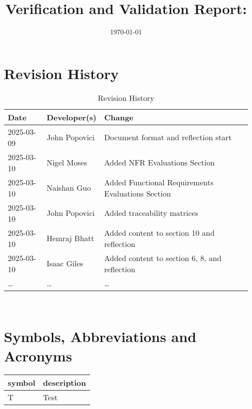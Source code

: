 \documentclass[12pt, titlepage]{article}
\begin{document}
\title{Verification and Validation Report: \progname} 
\author{\authname}
\date{\today}
	
\maketitle


\section{Revision History}

\begin{table}[hp]
\caption{Revision History} \label{TblRevisionHistory}
\begin{tabularx}{\textwidth}{llX}
\toprule
\textbf{Date} & \textbf{Developer(s)} & \textbf{Change}\\
\midrule
2025-03-09 & John Popovici & Document format and reflection start\\
2025-03-10 & Nigel Moses & Added NFR Evaluations Section\\
2025-03-10 & Naishan Guo & Added Functional Requirements Evaluations Section\\
2025-03-10 & John Popovici & Added traceability matrices\\
2025-03-10 & Hemraj Bhatt & Added content to section 10 and reflection\\
2025-03-10 & Isaac Giles & Added content to section 6, 8, and reflection\\
\dots & \dots & \dots \\
\bottomrule
\end{tabularx}
\end{table}

~\newpage

\section{Symbols, Abbreviations and Acronyms}

\renewcommand{\arraystretch}{1.2}
\begin{tabular}{l l} 
  \toprule		
  \textbf{symbol} & \textbf{description}\\
  \midrule 
  T & Test\\
  \bottomrule
\end{tabular}\\

\end{document}
